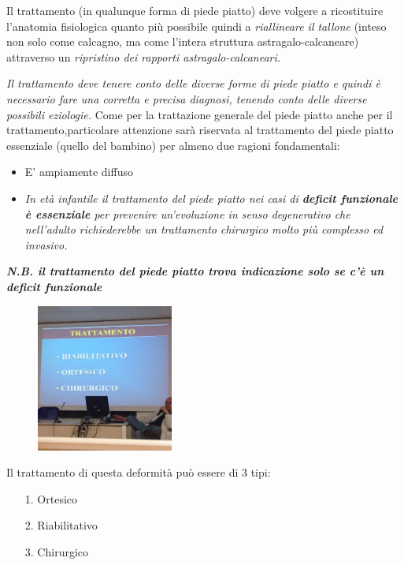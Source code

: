 Il trattamento (in qualunque forma di piede piatto) deve volgere a ricostituire l'anatomia fisiologica quanto più possibile quindi a \emph{riallineare il tallone} (inteso non solo come calcagno, ma come l'intera struttura astragalo-calcaneare) attraverso un \emph{ripristino
dei rapporti astragalo-calcaneari. }

\emph{Il trattamento deve tenere conto delle diverse forme di piede piatto e quindi è necessario fare una corretta e precisa diagnosi, tenendo conto delle diverse possibili eziologie.} Come per la trattazione generale del piede piatto anche per il trattamento,particolare attenzione sarà riservata al trattamento del piede piatto essenziale (quello del bambino) per almeno due ragioni fondamentali:

\begin{itemize}
\item
  E' ampiamente diffuso
\item
  \emph{In età infantile il trattamento del piede piatto nei casi di \textbf{deficit funzionale è essenziale} per prevenire un'evoluzione in senso degenerativo che nell'adulto richiederebbe un trattamento chirurgico molto più complesso ed invasivo.}
\end{itemize}

\textbf{\emph{N.B. il trattamento del piede piatto trova indicazione solo se c'è un deficit funzionale}}

\begin{figure}[!ht]
\centering
\includegraphics[width=0.4\textwidth]{015/image1.jpeg}
\end{figure}

Il trattamento di questa deformità può essere di 3 tipi:
\begin{itemize}
\item[1.] Ortesico
\item[2.] Riabilitativo
\item[3.] Chirurgico
\end{itemize}


